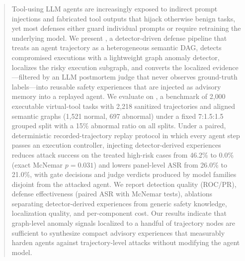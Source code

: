 \begin{abstract}
Tool-using LLM agents are increasingly exposed to indirect prompt injections and fabricated tool outputs that hijack otherwise benign tasks, yet most defenses either guard individual prompts or require retraining the underlying model. We present \method{}, a detector-driven defense pipeline that treats an agent trajectory as a heterogeneous semantic DAG, detects compromised executions with a lightweight graph anomaly detector, localizes the risky execution subgraph, and converts the localized evidence---filtered by an LLM postmortem judge that never observes ground-truth labels---into reusable safety experiences that are injected as advisory memory into a replayed agent. We evaluate on \tool{}, a benchmark of 2{,}000 executable virtual-tool tasks with 2{,}218 sanitized trajectories and aligned semantic graphs (1{,}521 normal, 697 abnormal) under a fixed 7:1.5:1.5 grouped split with a 15\% abnormal ratio on all splits. Under a paired, deterministic recorded-trajectory replay protocol in which every agent step passes an execution controller, injecting detector-derived experiences reduces attack success on the treated high-risk cases from 46.2\% to 0.0\% (exact McNemar $p=0.031$) and lowers panel-level ASR from 26.0\% to 21.0\%, with gate decisions and judge verdicts produced by model families disjoint from the attacked agent. We report detection quality (ROC/PR), defense effectiveness (paired ASR with McNemar tests), ablations separating detector-derived experiences from generic safety knowledge, localization quality, and per-component cost. Our results indicate that graph-level anomaly signals localized to a handful of trajectory nodes are sufficient to synthesize compact advisory experiences that measurably harden agents against trajectory-level attacks without modifying the agent model.
\end{abstract}